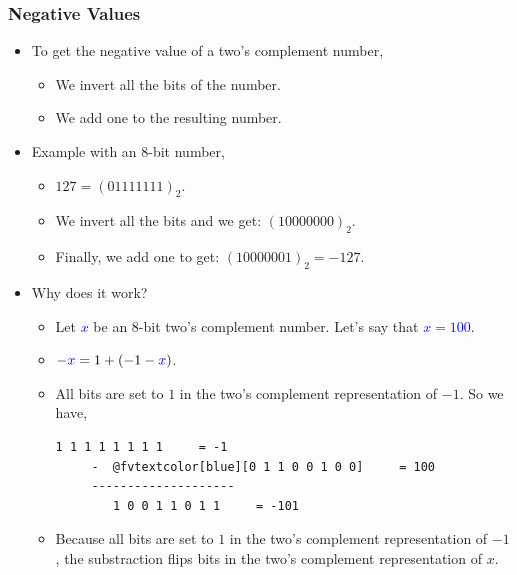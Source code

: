 \documentclass{beamer}
\begin{document}
\begin{frame}[fragile]
\frametitle{Negative Values}

\scriptsize

\begin{itemize}

\item To get the negative value of a two's complement number,
  \begin{itemize}
    \scriptsize
  \item We invert all the bits of the number.
  \item We add one to the resulting number.
  \end{itemize}

  \vspace{0.2cm}

\item Example with an $8$-bit number,
  \begin{itemize}
    \scriptsize
  \item $127 = (01111111)_2$.
  \item We invert all the bits and we get: $(10000000)_2$.
  \item Finally, we add one to get: $(10000001)_2 = -127$.
  \end{itemize}

  \vspace{0.2cm}

\item Why does it work?
  \begin{itemize}
    \scriptsize
  \item Let \textcolor{blue}{$x$} be an $8$-bit two's complement number. Let's say that \textcolor{blue}{$x = 100$}.
  \item $-\textcolor{blue}{x} = 1 + (-1 - \textcolor{blue}{x})$.
  \item All bits are set to $1$ in the two's complement representation of $-1$. So we have,
    \begin{center}
      \begin{Verbatim}[commandchars=@\[\]]
        1 1 1 1 1 1 1 1     = -1
     -  @fvtextcolor[blue][0 1 1 0 0 1 0 0]     = 100
     --------------------
        1 0 0 1 1 0 1 1     = -101
      \end{Verbatim}
    \end{center}
  \item Because all bits are set to $1$ in the two's complement representation of $-1$, the substraction flips bits in the two's complement
    representation of $x$.
  \end{itemize}

\end{itemize}

\end{frame}
\end{document}
